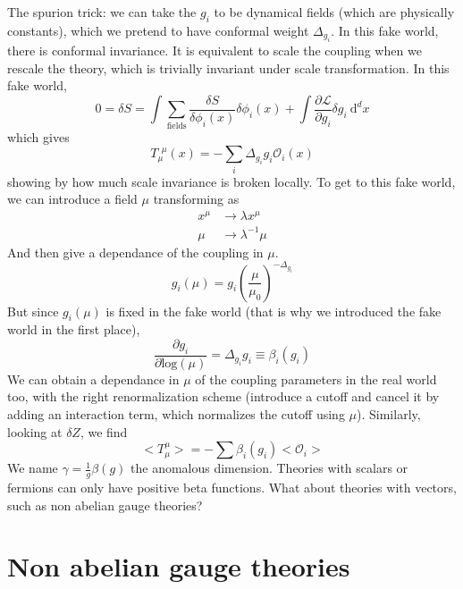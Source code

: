 \documentclass[a4paper]{book}
\theoremstyle{definition}
\theoremstyle{remark}
\begin{document}
The spurion trick: we can take the $g_i$ to be dynamical fields (which are physically constants), which we pretend to have conformal weight $\Delta_{g_i}$. In this fake world, there is conformal invariance. It is equivalent to scale the coupling when we rescale the theory, which is trivially invariant under scale transformation. In this fake world, 
\begin{equation}
    0 = \delta S = \int \sum_{\text{fields}} \frac{\delta S}{\delta \phi_i(x)} \delta\phi_i(x) + \int \frac{\partial \mathcal L}{\partial g_i}\delta g_i ~\text{d}^dx
\end{equation}
which gives 
\begin{equation}
    T_\mu^{~~\mu} (x) = -\sum_i \Delta_{g_i} g_i \mathcal O_i(x)
\end{equation}
showing by how much scale invariance is broken locally. To get to this fake world, we can introduce a field $\mu$ transforming as 
\begin{equation}
    \begin{aligned}
        x^\mu &\rightarrow \lambda x^\mu \\ 
        \mu &\rightarrow \lambda^{-1}\mu 
    \end{aligned}
\end{equation}
And then give a dependance of the coupling in $\mu$. 
\begin{equation}
    g_i(\mu) = g_i \left(\frac{\mu}{\mu_0}\right)^{-\Delta_{g_i}}
\end{equation}
But since $g_i(\mu)$ is fixed in the fake world (that is why we introduced the fake world in the first place), 
\begin{equation}
    \frac{\partial g_i}{\partial \text{log}(\mu)} = \Delta_{g_i} g_i \equiv \beta_i(g_i)
\end{equation}
We can obtain a dependance in $\mu$ of the coupling parameters in the real world too, with the right renormalization scheme (introduce a cutoff and cancel it by adding an interaction term, which normalizes the cutoff using $\mu$). Similarly, looking at $\delta Z$, we find 
\begin{equation}
    <T_\mu^\mu> = - \sum \beta_i(g_i)<\mathcal O_i>
\end{equation}
We name $\gamma = \frac{1}{g}\beta(g)$ the anomalous dimension. Theories with scalars or fermions can only have positive beta functions. What about theories with vectors, such as non abelian gauge theories? 

\section{Non abelian gauge theories}
\end{document}
